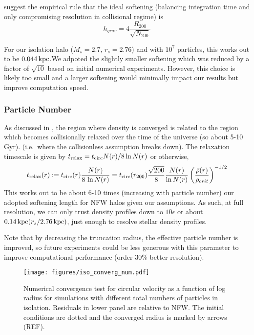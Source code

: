 \citet{power+2003} suggest the empirical rule that the ideal softening
(balancing integration time and only compromising resolution in
collisional regime) is \[
h_{grav} = 4 \frac{R_{200}}{\sqrt{N_{200}}}
\]

For our isolation halo (\(M_s=2.7\), \(r_s=2.76\)) and with \(10^7\)
particles, this works out to be \(0.044\,{\rm kpc}\).We adpoted the
slightly smaller softening which was reduced by a factor of
\(\sqrt{10}\) based on initial numerical experiments. However, this
choice is likely too small and a larger softening would minimally impact
our results but improve computation speed.

\subsubsection{Particle Number}\label{particle-number}

As discussed in \citet{power+2003}, the region where density is
converged is related to the region which becomes collisionally relaxed
over the time of the universe (so about 5-10 Gyr). (i.e.~where the
collisionless assumption breaks down). The relaxation timescale is given
by \(t_{\rm relax} = t_{\rm circ} N(r) / 8\ln N(r)\) or otherwise, \[
t_{\rm relax}(r) := t_{\rm circ}(r) \frac{N(r)}{8\,\ln N(r)}
= {t_{\rm circ}(r_{200})} \frac{\sqrt{200}}{8} \frac{N(r)}{\ln N(r)} \left(\frac{\bar \rho (r)}{\rho_{\textrm crit}}\right)^{-1/2}
\] This works out to be about 6-10 times (increasing with particle
number) our adopted softening length for NFW halos given our
assumptions. As such, at full resolution, we can only trust density
profiles down to \(10\epsilon\) or about
\(0.14\,{\rm kpc} (r_s/2.76\,{\rm kpc})\), just enough to resolve
stellar density profiles.

Note that by decreasing the truncation radius, the effective particle
number is improved, so future experiments could be less generous with
this parameter to improve computational performance (order 30\% better
resolution).

\begin{figure}
\centering
\texttt{[image: figures/iso\_converg\_num.pdf]}
\caption[num convergence]{Numerical convergence test for circular
velocity as a function of log radius for simulations with different
total numbers of particles in isolation. Residuals in lower panel are
relative to NFW. The initial conditions are dotted and the converged
radius is marked by arrows (REF).}
\end{figure}

